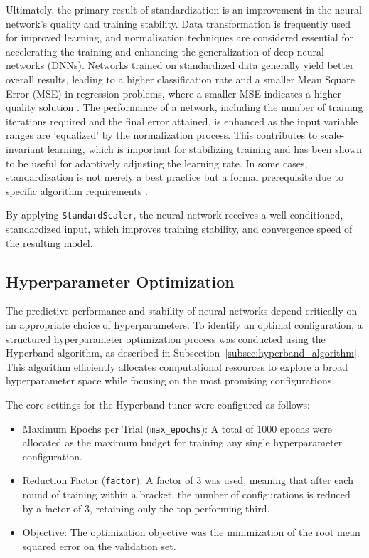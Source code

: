 {Ultimately, the primary result of standardization is an improvement in the neural network's quality and training stability. Data transformation is frequently used for improved learning, and normalization techniques are considered essential for accelerating the training and enhancing the generalization of deep neural networks (DNNs). Networks trained on standardized data generally yield better overall results, leading to a higher classification rate and a smaller Mean Square Error (MSE) in regression problems, where a smaller MSE indicates a higher quality solution \parencite{shanker1996effectdatastandardization}. The performance of a network, including the number of training iterations required and the final error attained, is enhanced as the input variable ranges are 'equalized' by the normalization process. This contributes to scale-invariant learning, which is important for stabilizing training and has been shown to be useful for adaptively adjusting the learning rate. In some cases, standardization is not merely a best practice but a formal prerequisite due to specific algorithm requirements \parencite{huang2020normalizationtechniquestrainingdnns}.

By applying \texttt{StandardScaler}, the neural network receives a well-conditioned, standardized input, which improves training stability, and convergence speed of the resulting model.

\subsection{Hyperparameter Optimization}
\label{subsec:hyperparameter_optimization}

The predictive performance and stability of neural networks depend critically on an appropriate choice of hyperparameters. To identify an optimal configuration, a structured hyperparameter optimization process was conducted using the Hyperband algorithm, as described in Subsection~\ref{subsec:hyperband_algorithm}. This algorithm efficiently allocates computational resources to explore a broad hyperparameter space while focusing on the most promising configurations.

The core settings for the Hyperband tuner were configured as follows:
\begin{itemize}
	\item Maximum Epochs per Trial (\texttt{max\_epochs}): A total of 1000 epochs were allocated as the maximum budget for training any single hyperparameter configuration.
	\item Reduction Factor (\texttt{factor}): A factor of 3 was used, meaning that after each round of training within a bracket, the number of configurations is reduced by a factor of 3, retaining only the top-performing third.
	\item Objective: The optimization objective was the minimization of the root mean squared error on the validation set.
\end{itemize}

}

